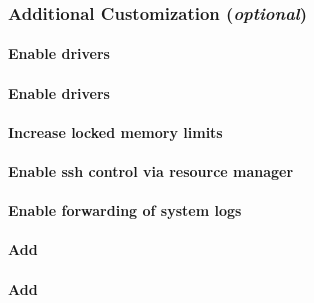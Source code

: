\documentclass[letterpaper]{article}
\begin{document}

\subsubsection{Additional Customization ({\em optional})} \label{sec:addl_customizations}


\paragraph{Enable \InfiniBand{} drivers}


\paragraph{Enable \OmniPath{} drivers}


\vspace*{0.28cm}
\paragraph{Increase locked memory limits}


\vspace*{-.17cm}
\paragraph{Enable ssh control via resource manager}


\paragraph{Enable forwarding of system logs} \label{sec:add_syslog}


\paragraph{Add \clustershell{}}


\paragraph{Add \genders{}}

\end{document}
